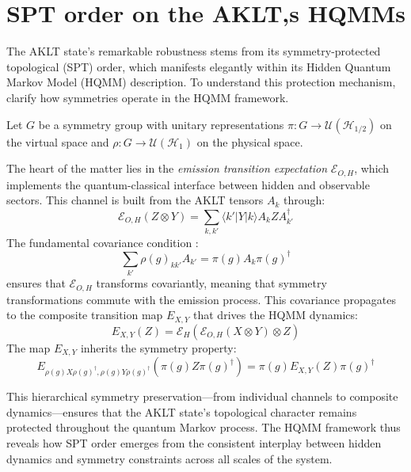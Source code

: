 \documentclass[12pt,a4paper]{article}
\begin{document}
\section{SPT order on the AKLT,s HQMMs}\label{Sect_SPT_HQMM}
The AKLT state's remarkable robustness stems from its symmetry-protected topological (SPT) order, which manifests elegantly within its Hidden Quantum Markov Model (HQMM) description. To understand this protection mechanism,  clarify how symmetries operate in the HQMM framework.

Let $G$ be a symmetry group with unitary representations $\pi: G \to \mathcal{U}(\mathcal{H}_{1/2})$ on the virtual space and $\rho: G \to \mathcal{U}(\mathcal{H}_1)$ on the physical space.



The heart of the matter lies in the \emph{emission transition expectation} $\mathcal{E}_{O,H}$, which implements the quantum-classical interface between hidden and observable sectors. This channel is built from the AKLT tensors $A_k$ through:
\begin{equation}\label{eq:EOH2}
  \mathcal{E}_{O,H}(Z \otimes Y) = \sum_{k,k'} \langle k'|Y|k\rangle A_k Z A_{k'}^\dagger
\end{equation}
The fundamental covariance condition \cite{AKLT1987,Pollmann2010}:
\begin{equation*}\label{eq:Cov}
    \sum_{k'} \rho(g)_{k k'} A_{k'} = \pi(g) A_k \pi(g)^\dagger
\end{equation*}
ensures that $\mathcal{E}_{O,H}$ transforms covariantly, meaning that symmetry transformations commute with the emission process. This covariance propagates to the composite transition map $E_{X,Y}$ that drives the HQMM dynamics:
\[
E_{X,Y}(Z) = \mathcal{E}_H(\mathcal{E}_{O,H}(X \otimes Y) \otimes Z)
\]
The map $E_{X,Y}$ inherits the symmetry property:
\[
E_{\rho(g)X\rho(g)^\dagger, \rho(g)Y\rho(g)^\dagger}(\pi(g)Z\pi(g)^\dagger) = \pi(g)E_{X,Y}(Z)\pi(g)^\dagger
\]

This hierarchical symmetry preservation---from individual channels to composite dynamics---ensures that the AKLT state's topological character remains protected throughout the quantum Markov process. The HQMM framework thus reveals how SPT order emerges from the consistent interplay between hidden dynamics and symmetry constraints across all scales of the system.
\end{document}
